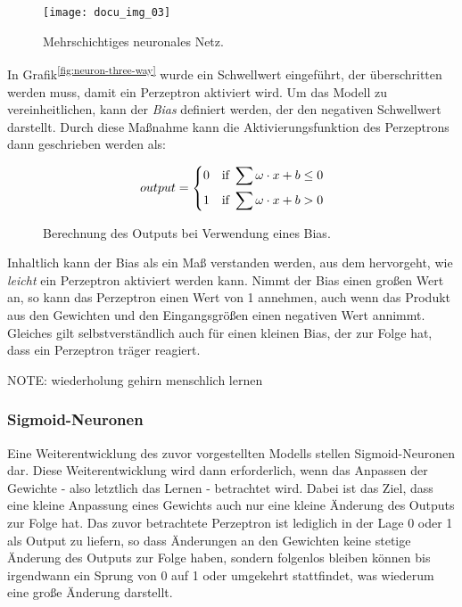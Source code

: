 \begin{figure}[H]
    \centering
    \texttt{[image: docu\_img\_03]}
    \caption{Mehrschichtiges neuronales Netz.}
    \label{fig:multi-layer-net}
\end{figure}

In Grafik\textsuperscript{\ref{fig:neuron-three-way}} wurde ein Schwellwert eingeführt, der überschritten werden muss, damit ein Perzeptron aktiviert wird. Um das Modell zu vereinheitlichen, kann der \textit{Bias} definiert werden, der den negativen Schwellwert darstellt. Durch diese Maßnahme kann die Aktivierungsfunktion des Perzeptrons dann geschrieben werden als:

\begin{figure}[H]
    \centering
    \[ output =
          \begin{dcases}
            0 \quad \text{if } \sum \omega \cdot x + b \leq 0 \\
            1 \quad \text{if } \sum \omega \cdot x + b > 0
          \end{dcases}
    \]
    \caption{Berechnung des Outputs bei Verwendung eines Bias.}
    \label{fig:bias-calculation}
\end{figure}

Inhaltlich kann der Bias als ein Maß verstanden werden, aus dem hervorgeht, wie \textit{leicht} ein Perzeptron aktiviert werden kann. Nimmt der Bias einen großen Wert an, so kann das Perzeptron einen Wert von 1 annehmen, auch wenn das Produkt aus den Gewichten und den Eingangsgrößen einen negativen Wert annimmt. Gleiches gilt selbstverständlich auch für einen kleinen Bias, der zur Folge hat, dass ein Perzeptron träger reagiert.

NOTE:
wiederholung gehirn menschlich lernen

\subsubsection{Sigmoid-Neuronen}

Eine Weiterentwicklung des zuvor vorgestellten Modells stellen Sigmoid-Neuronen dar. Diese Weiterentwicklung wird dann erforderlich, wenn das Anpassen der Gewichte - also letztlich das Lernen - betrachtet wird. Dabei ist das Ziel, dass eine kleine Anpassung eines Gewichts auch nur eine kleine Änderung des Outputs zur Folge hat. Das zuvor betrachtete Perzeptron ist lediglich in der Lage 0 oder 1 als Output zu liefern, so dass Änderungen an den Gewichten keine stetige Änderung des Outputs zur Folge haben, sondern folgenlos bleiben können bis irgendwann ein Sprung von 0 auf 1 oder umgekehrt stattfindet, was wiederum eine große Änderung darstellt.

